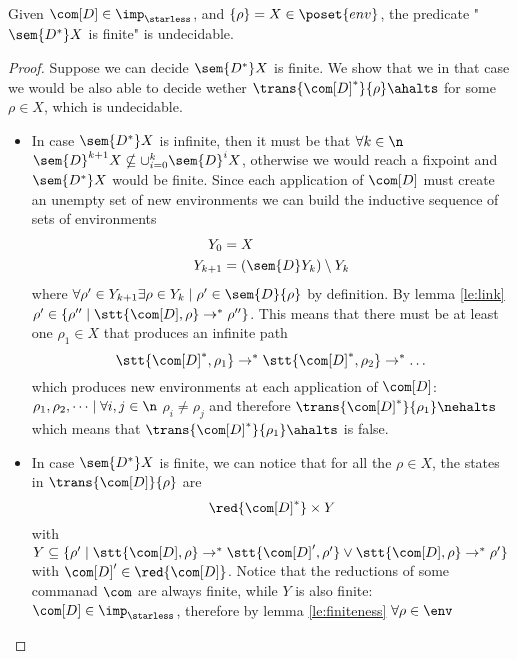\begin{lemma}\label{le:infiniteness}
  Given \(\com[D]\in\imp_\starless\), and \(\{\rho\} = X \in
  \poset{env}\), the predicate "\(\sem{D^*}X\) is finite" is
  undecidable.
\end{lemma}

\begin{proof}
  Suppose we can decide \(\sem{D^*}X\) is finite. We show that we in
  that case we would be also able to decide wether
  \(\trans{\com[D]^*}{\rho}\ahalts\) for some \(\rho \in X\), which is
  undecidable.%
  \begin{itemize}
  \item In case \(\sem{D^*}X\) is infinite, then it must be that
    \(\forall k \in \n\) \(\sem{D}^{k+1}X \nsubseteq
    \cup_{i=0}^k\sem{D}^iX\), otherwise we would reach a fixpoint
    and \(\sem{D^*}X\) would be finite. Since each application of
    \(\com[D]\) must create an unempty set of new environments we can
    build the inductive sequence of sets of environments
    \begin{align*}
      Y_0 & = X \\
      Y_{k+1} & = (\sem{D}Y_k)\setminus Y_k
    \end{align*}
    where \(\forall \rho' \in Y_{k+1} \exists \rho \in Y_k \mid \rho'
    \in \sem{D}\{\rho\}\) by definition. By lemma \ref{le:link}
    \(\rho' \in \{\rho'' \mid \stt{\com[D], \rho} \to^*
    \rho''\}\). This means that there must be at least one \(\rho_1\in
    X\) that produces an infinite path \[\stt{\com[D]^*,
      \rho_1}\to^*\stt{\com[D]^*, \rho_2}\to^*\dots \] which produces
    new environments at each application of \(\com[D]\): \(\rho_1,
    \rho_2, \dots \mid \forall i,j \in \n\) \(\rho_i \neq \rho_j\) and
    therefore \(\trans{\com[D]^*}{\rho_1} \nehalts\) which means that
    \(\trans{\com[D]^*}{\rho_1}\ahalts\) is false.
  \item In case \(\sem{D^*}X\) is finite, we can notice that for all
    the \(\rho \in X\), the states in \(\trans{\com[D]}{\rho}\)
    are \[\red{\com[D]^*}\times Y\] with
    \(Y \subseteq \{\rho'\mid \stt{\com[D], \rho} \to^* \stt{\com[D]',
      \rho'} \vee \stt{\com[D],\rho} \to^* \rho'\}\) with
    \(\com[D]'\in \red{\com[D]}\). Notice that the reductions of some
    commanad \(\com\) are always finite, while \(Y\) is also finite:
    \(\com[D] \in \imp_\starless\), therefore by lemma
    \ref{le:finiteness} \(\forall \rho \in \env\)

\end{itemize}
\end{proof}
